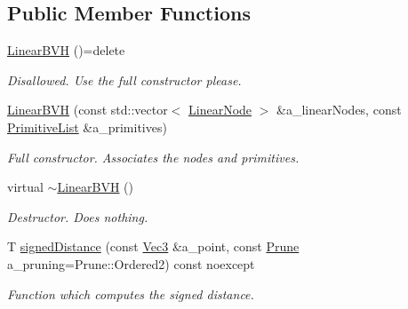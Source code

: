 \subsection*{Public Member Functions}
\begin{DoxyCompactItemize}
\item 
\mbox{\label{classBVH_1_1LinearBVH_af071dcad6741be1314c0b39512d2f142}} 
\hyperlink{classBVH_1_1LinearBVH_af071dcad6741be1314c0b39512d2f142}{Linear\+B\+VH} ()=delete
\begin{DoxyCompactList}\small\item\em Disallowed. Use the full constructor please. \end{DoxyCompactList}\item 
\hyperlink{classBVH_1_1LinearBVH_a82e767c16424e19c5dfbe671dd111e32}{Linear\+B\+VH} (const std\+::vector$<$ \hyperlink{classBVH_1_1LinearBVH_ad8c5e4f84138090dbd408a075dc91896}{Linear\+Node} $>$ \&a\+\_\+linear\+Nodes, const \hyperlink{classBVH_1_1LinearBVH_a94ee5da1670e2ef85eeabf7cf6a2da92}{Primitive\+List} \&a\+\_\+primitives)
\begin{DoxyCompactList}\small\item\em Full constructor. Associates the nodes and primitives. \end{DoxyCompactList}\item 
\mbox{\label{classBVH_1_1LinearBVH_a39a98014b81061b35604422cfab5c9b7}} 
virtual \hyperlink{classBVH_1_1LinearBVH_a39a98014b81061b35604422cfab5c9b7}{$\sim$\+Linear\+B\+VH} ()
\begin{DoxyCompactList}\small\item\em Destructor. Does nothing. \end{DoxyCompactList}\item 
T \hyperlink{classBVH_1_1LinearBVH_a383c6289251cf75ad9c4ed11cfb832ab}{signed\+Distance} (const \hyperlink{classBVH_1_1LinearBVH_a13b0083e8b7ff1a5e170d39d69e6a15a}{Vec3} \&a\+\_\+point, const \hyperlink{namespaceBVH_a3ddb7b34ac1deb3baed2f32d9eacbe5b}{Prune} a\+\_\+pruning=Prune\+::\+Ordered2) const noexcept
\begin{DoxyCompactList}\small\item\em Function which computes the signed distance. \end{DoxyCompactList}\end{DoxyCompactItemize}
